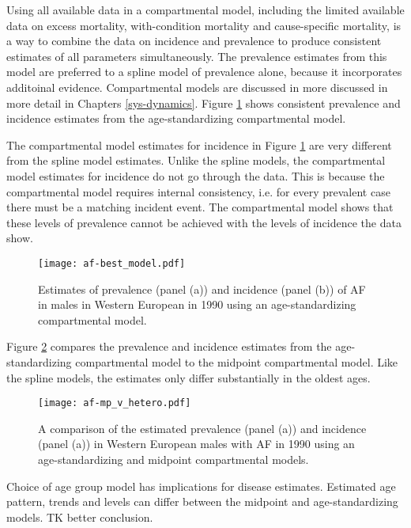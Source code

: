 Using all available data in a compartmental model, including the
limited available data on excess mortality, with-condition mortality
and cause-specific mortality, is a way to combine the data on
incidence and prevalence to produce consistent estimates of all
parameters simultaneously.  The prevalence estimates from this model
are preferred to a spline model of prevalence alone, because it
incorporates additoinal evidence.  Compartmental models are discussed in
more discussed in more detail in Chapters \ref{sys-dynamics}.  Figure
\ref{fig:app-af age-stand} shows consistent prevalence and incidence estimates
from the age-standardizing compartmental model.

The compartmental model estimates for incidence in Figure \ref{fig:app-af age-stand} 
are very different from the spline model estimates.  
Unlike the spline models, the compartmental model estimates for 
incidence do not go through the data.  This is because the compartmental model 
requires internal consistency, i.e. for every prevalent case there must be 
a matching incident event.  The compartmental model shows that these levels 
of prevalence cannot be achieved with the levels of incidence the data show.

    \begin{figure}[h]
        \begin{center}
            \texttt{[image: af-best\_model.pdf]}
            \caption{Estimates of prevalence (panel (a)) and incidence (panel (b))
              of AF in males in Western European in 1990 using
              an age-standardizing compartmental model.}
            \label{fig:app-af age-stand}
        \end{center}
    \end{figure}

Figure \ref{fig:app-af compare} compares the prevalence and incidence
estimates from the age-standardizing compartmental model to the
midpoint compartmental model.  Like the spline models, the
estimates only differ substantially in the oldest ages.

    \begin{figure}[h]
        \begin{center}
            \texttt{[image: af-mp\_v\_hetero.pdf]}
            \caption{A comparison of the estimated prevalence (panel (a)) and incidence
              (panel (a)) in Western European males with AF in 1990
              using an age-standardizing and midpoint compartmental models.}
            \label{fig:app-af compare}
        \end{center}
    \end{figure}

Choice of age group model has implications for disease estimates.
Estimated age pattern, trends and levels can differ between the
midpoint and age-standardizing models.  TK better conclusion.
